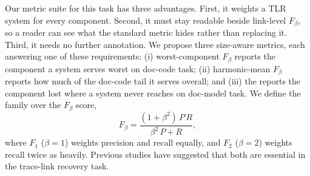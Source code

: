 Our metric suite for this task has three advantages.
First, it weights a TLR system for every component. 
Second, it must stay readable beside link-level $F_\beta$, so a reader can see what the standard metric hides rather than replacing it.
Third, it needs no further annotation.
We propose three size-aware metrics, each answering one of these requirements: 
(i) worst-component $F_\beta$ reports the component a system serves worst on doc-code task; %
(ii) harmonic-mean $F_\beta$ reports how much of the doc-code tail it serves overall;  %
and (iii) the \cmrname{} reports the component lost where a system never reaches on doc-model task.
We define the family over the $F_\beta$ score,
\begin{equation}
F_\beta = \frac{(1+\beta^2)\,P\,R}{\beta^2\,P + R},
\label{eq:fbeta}
\end{equation}
where $F_1$ ($\beta = 1$) weights precision and recall equally, and $F_2$ ($\beta = 2$) weights recall twice as heavily.
Previous studies have suggested that both are essential in the trace-link recovery task.

